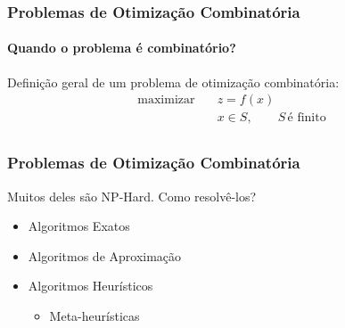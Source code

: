 \documentclass[10pt,fleqn]{beamer}
\newcommand{\litem}[1]{
  \item{#1 \vspace{9pt}}
}
\begin{document}

\begin{frame}
  \frametitle{Problemas de Otimização Combinatória}
  \framesubtitle{Quando o problema é combinatório?}
  Definição geral de um problema de otimização combinatória:
  \begin{align}
    \textrm{maximizar}
      \quad & z = f(x) \nonumber \\
  	  \quad & x \in S \nonumber, \qquad S \, \textrm{é finito} \\
	  \nonumber
  \end{align}
\end{frame}



\begin{frame}
  \frametitle{Problemas de Otimização Combinatória}
  Muitos deles são NP-Hard. Como resolvê-los?
  \vspace{10pt}
  \begin{itemize}
    \litem{Algoritmos Exatos}
    \litem{Algoritmos de Aproximação}
    \litem{Algoritmos Heurísticos}
	\begin{itemize}
	  \item{Meta-heurísticas}
	\end{itemize}
  \end{itemize}
\end{frame}
\end{document}
